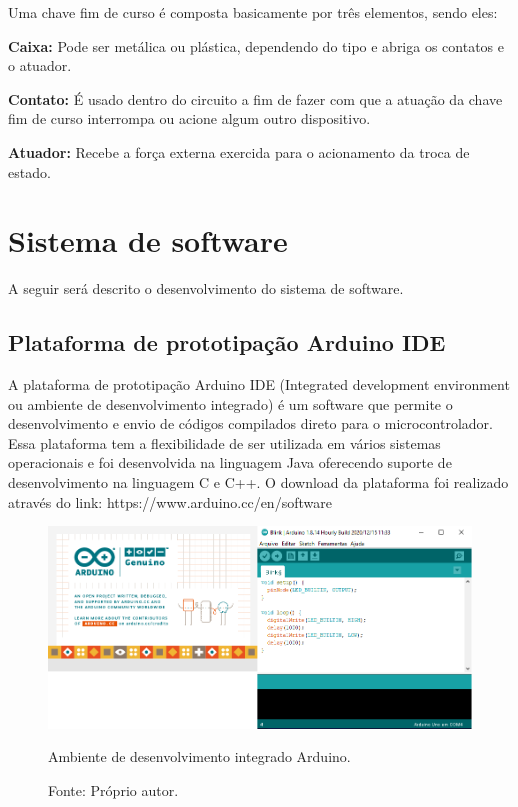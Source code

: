 Uma chave fim de curso é composta basicamente por três elementos, sendo eles:

\begin{alineas}
    \item \textbf{Caixa:} Pode ser metálica ou plástica, dependendo do tipo e abriga os contatos e o atuador.
    \item \textbf{Contato:} É usado dentro do circuito a fim de fazer com que a atuação da chave fim de curso interrompa ou 
    acione algum outro dispositivo.
    \item \textbf{Atuador:} Recebe a força externa exercida para o acionamento da troca de estado.
\end{alineas}

\section{Sistema de software}\label{sec:metsissof}

A seguir será descrito o desenvolvimento do sistema de software.

\subsection{Plataforma de prototipação Arduino IDE}\label{subsec:metide}

A plataforma de prototipação Arduino IDE (Integrated development environment ou ambiente de desenvolvimento 
integrado) é um software que permite o desenvolvimento e envio de códigos compilados direto para o 
microcontrolador. Essa plataforma tem a flexibilidade de ser utilizada em vários sistemas operacionais 
e foi desenvolvida na linguagem Java oferecendo suporte de desenvolvimento na linguagem C e C++. 
O download da plataforma foi realizado através do link: https://www.arduino.cc/en/software

\begin{figure}[!htb]
\centering
\includegraphics[scale = 0.5]{figuras/3-19}
\caption{Ambiente de desenvolvimento integrado Arduino.}
\caption*{Fonte: Próprio autor.}
\label{fig:idearduino}
\end{figure}
    
